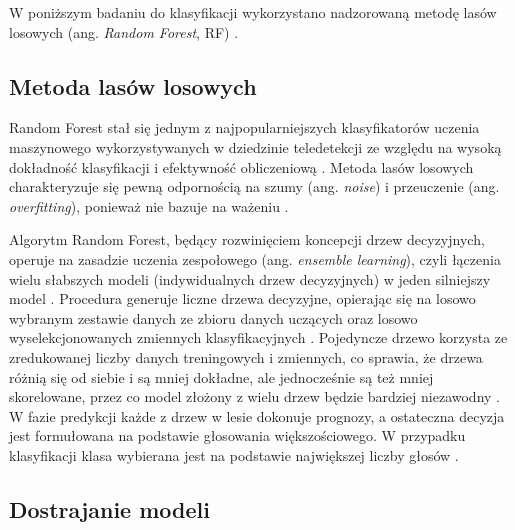 \documentclass{amuthesis}
\begin{document}
W poniższym badaniu do klasyfikacji wykorzystano nadzorowaną metodę
lasów losowych (ang. \emph{Random Forest}, RF)
\autocite{breiman_2001_rf}.

\hypertarget{sec-random-forest}{%
\subsection{Metoda lasów losowych}\label{sec-random-forest}}

Random Forest stał się jednym z najpopularniejszych klasyfikatorów
uczenia maszynowego wykorzystywanych w dziedzinie teledetekcji ze
względu na wysoką dokładność klasyfikacji i efektywność obliczeniową
\autocite{belgiu_2016_rf,sheykhmousa_2020_svm_vs_rf}. Metoda lasów
losowych charakteryzuje się pewną odpornością na szumy (ang.
\emph{noise}) i przeuczenie (ang. \emph{overfitting}), ponieważ nie
bazuje na ważeniu \autocite{gislason_2006_rf}.

Algorytm Random Forest, będący rozwinięciem koncepcji drzew decyzyjnych,
operuje na zasadzie uczenia zespołowego (ang. \emph{ensemble learning}),
czyli łączenia wielu słabszych modeli (indywidualnych drzew decyzyjnych)
w jeden silniejszy model
\autocite{aaron_2018_ml,sekulic_2020_rf_interpolation}. Procedura
generuje liczne drzewa decyzyjne, opierając się na losowo wybranym
zestawie danych ze zbioru danych uczących oraz losowo wyselekcjonowanych
zmiennych klasyfikacyjnych \autocite{breiman_2001_rf}. Pojedyncze drzewo
korzysta ze zredukowanej liczby danych treningowych i zmiennych, co
sprawia, że drzewa różnią się od siebie i są mniej dokładne, ale
jednocześnie są też mniej skorelowane, przez co model złożony z wielu
drzew będzie bardziej niezawodny
\autocite{sekulic_2020_rf_interpolation}. W fazie predykcji każde z
drzew w lesie dokonuje prognozy, a ostateczna decyzja jest formułowana
na podstawie głosowania większościowego. W przypadku klasyfikacji klasa
wybierana jest na podstawie największej liczby głosów
\autocite{breiman_2001_rf}.

\hypertarget{sec-tuning}{%
\subsection{Dostrajanie modeli}\label{sec-tuning}}
\end{document}
